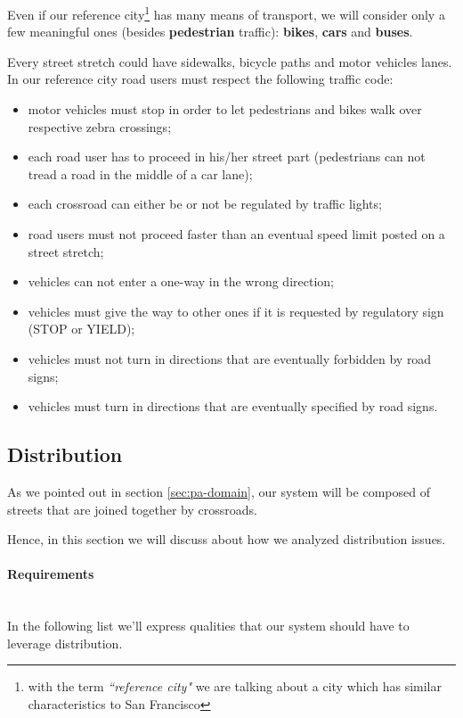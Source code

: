 Even if our reference city\footnote{with the term \emph{``reference city"}
we are talking about a city which has similar characteristics to San
Francisco} has many means of transport, we will consider only a few meaningful
ones (besides \textbf{pedestrian} traffic): \textbf{bikes}, \textbf{cars} and
\textbf{buses}.

Every street stretch could have sidewalks, bicycle paths and motor vehicles
lanes. In our reference city road users must respect the following traffic
code:

\begin{itemize}
\item motor vehicles must stop in order to let pedestrians and bikes walk over
  respective zebra crossings;
\item each road user has to proceed in his/her street part (pedestrians can not
  tread a road in the middle of a car lane);
\item each crossroad can either be or not be regulated by traffic lights;
\item road users must not proceed faster than an eventual speed limit posted
  on a street stretch;
\item vehicles can not enter a one-way in the wrong direction;
\item vehicles must give the way to other ones if it is requested by
  regulatory sign (STOP or YIELD);
\item vehicles must not turn in directions that are eventually forbidden by
  road signs;
\item vehicles must turn in directions that are eventually specified by road
  signs.
\end{itemize}

\subsection{Distribution}\label{sec:pa-distribution}
As we pointed out in section \ref{sec:pa-domain}, our system will be composed
of streets that are joined together by crossroads.

Hence, in this section we will discuss about how we analyzed distribution issues.

\paragraph{Requirements} \mbox{} \\

In the following list we’ll express qualities that our system should have to leverage distribution.

